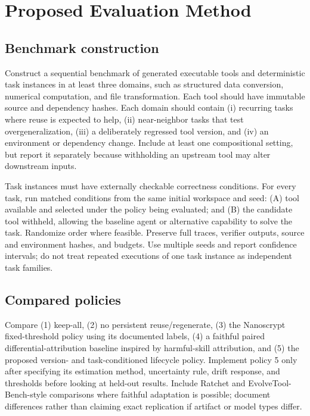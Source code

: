 \documentclass[11pt]{article}
\begin{document}
\section{Proposed Evaluation Method}
\subsection{Benchmark construction}
Construct a sequential benchmark of generated executable tools and deterministic task instances in at least three domains, such as structured data conversion, numerical computation, and file transformation. Each tool should have immutable source and dependency hashes. Each domain should contain (i) recurring tasks where reuse is expected to help, (ii) near-neighbor tasks that test overgeneralization, (iii) a deliberately regressed tool version, and (iv) an environment or dependency change. Include at least one compositional setting, but report it separately because withholding an upstream tool may alter downstream inputs.

Task instances must have externally checkable correctness conditions. For every task, run matched conditions from the same initial workspace and seed: (A) tool available and selected under the policy being evaluated; and (B) the candidate tool withheld, allowing the baseline agent or alternative capability to solve the task. Randomize order where feasible. Preserve full traces, verifier outputs, source and environment hashes, and budgets. Use multiple seeds and report confidence intervals; do not treat repeated executions of one task instance as independent task families.

\subsection{Compared policies}
Compare (1) keep-all, (2) no persistent reuse/regenerate, (3) the Nanoscrypt fixed-threshold policy using its documented labels, (4) a faithful paired differential-attribution baseline inspired by harmful-skill attribution, and (5) the proposed version- and task-conditioned lifecycle policy. Implement policy 5 only after specifying its estimation method, uncertainty rule, drift response, and thresholds before looking at held-out results. Include Ratchet and EvolveTool-Bench-style comparisons where faithful adaptation is possible; document differences rather than claiming exact replication if artifact or model types differ.
\end{document}
